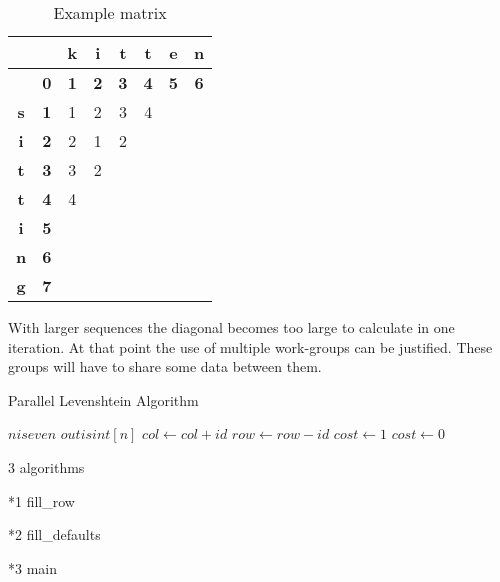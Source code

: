 {\newcommand\C[0]{\cellcolor{gray}}

\begin{table}
\centering \caption{Example matrix} \label{diagonal}
\large
\begin{tabular}{|c|c||c|c|c|c|c|c|} \hline
           &            & \textbf{k} & \textbf{i} & \textbf{t} & \textbf{t} & \textbf{e} & \textbf{n} \\ \hline
           & \textbf{0} & \textbf{1} & \textbf{2} & \textbf{3} & \textbf{4} & \textbf{5} & \textbf{6} \\ \hline \hline
\textbf{s} & \textbf{1} & 1          & 2          & 3          & 4          & \C         &            \\ \hline
\textbf{i} & \textbf{2} & 2          & 1          & 2          & \C         &            &            \\ \hline
\textbf{t} & \textbf{3} & 3          & 2          & \C         &            &            &            \\ \hline
\textbf{t} & \textbf{4} & 4          & \C         &            &            &            &            \\ \hline
\textbf{i} & \textbf{5} & \C         &            &            &            &            &            \\ \hline
\textbf{n} & \textbf{6} &            &            &            &            &            &            \\ \hline
\textbf{g} & \textbf{7} &            &            &            &            &            &            \\ \hline
\end{tabular}
\end{table}
}

With larger sequences the diagonal becomes too large to calculate in one iteration.
At that point the use of multiple work-groups can be justified.
These groups will have to share some data between them.

\begin{algorithm}
\caption{Parallel Levenshtein Algorithm} \label{pseudo}
\begin{algorithmic}[1]
    \Require $n is even$
    \Require $out is int[n]$
    \State $col\gets col + id$
    \State $row\gets row - id$
            \State $cost\gets 1$
        \Else
            \State $cost\gets 0$
        \EndIf
        
        
    \EndFor
\EndProcedure
\end{algorithmic}
\end{algorithm}

3 algorithms

*1 fill_row

*2 fill_defaults

*3 main
